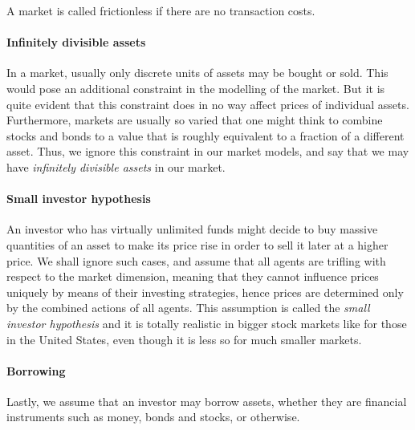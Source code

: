 \begin{dfn}
	A market is called frictionless if there are no transaction costs.
\end{dfn}


\paragraph{Infinitely divisible assets}
In a market, usually only discrete units of assets may be bought or sold. This would pose an additional constraint in the modelling of the market. But it is quite evident that this constraint does in no way affect prices of individual assets. Furthermore, markets are usually so varied that one might think to combine stocks and bonds to a value that is roughly equivalent to a fraction of a different asset. Thus, we ignore this constraint in our market models, and say that we may have \emph{infinitely divisible assets} in our market.


\paragraph{Small investor hypothesis}
An investor who has virtually unlimited funds might decide to buy massive quantities of an asset to make its price rise in order to sell it later at a higher price. We shall ignore such cases, and assume that all agents are trifling with respect to the market dimension, meaning that they cannot influence prices uniquely by means of their investing strategies, hence prices are determined only by the combined actions of all agents. This assumption is called the \emph{small investor hypothesis} and it is totally realistic in bigger stock markets like for those in the United States, even though it is less so for much smaller markets.


\paragraph{Borrowing}
Lastly, we assume that an investor may borrow assets, whether they are financial instruments such as money, bonds and stocks, or otherwise.


